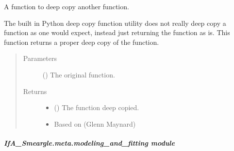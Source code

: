 \documentclass[letterpaper,10pt,english]{sphinxmanual}
\begin{document}

\begin{fulllineitems}
\label{\detokenize{python_docstrings/IfA_Smeargle.meta.meta_programming:IfA_Smeargle.meta.meta_programming.smeargle_deepcopy_function}}
A function to deep copy another function.

The built in Python deep copy function utility does not really deep copy
a function as one would expect, instead just returning the function as is.
This function returns a proper deep copy of the function.
\begin{quote}\begin{description}
\item[{Parameters}] \leavevmode
{} () \textendash{} The original function.

\item[{Returns}] \leavevmode
\begin{itemize}
\item {} 
 () \textendash{} The function deep copied.

\item {} 
 \textendash{} Based on  (Glenn Maynard)

\end{itemize}


\end{description}\end{quote}

\end{fulllineitems}



\subparagraph{IfA\_Smeargle.meta.modeling\_and\_fitting module}
\label{\detokenize{python_docstrings/IfA_Smeargle.meta.modeling_and_fitting:module-IfA_Smeargle.meta.modeling_and_fitting}}\label{\detokenize{python_docstrings/IfA_Smeargle.meta.modeling_and_fitting:ifa-smeargle-meta-modeling-and-fitting-module}}\label{\detokenize{python_docstrings/IfA_Smeargle.meta.modeling_and_fitting::doc}}
\end{document}
